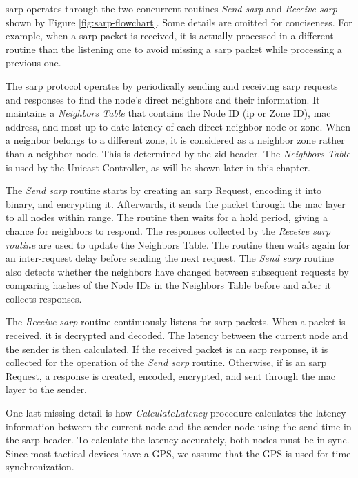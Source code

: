 \acrshort{sarp} operates through the two concurrent routines \textit{Send \acrshort{sarp}} and \textit{Receive \acrshort{sarp}} shown by Figure \ref{fig:sarp-flowchart}.
Some details are omitted for conciseness. For example, when a \acrshort{sarp} packet is received, it is actually processed in a different routine than the listening one to avoid missing a \acrshort{sarp} packet while processing a previous one.

The \acrshort{sarp} protocol operates by periodically sending and receiving \acrshort{sarp} requests and responses to find the node's direct neighbors and their information. It maintains a \textit{Neighbors Table} that contains the Node ID (\acrshort{ip} or Zone ID), \acrshort{mac} address, and most up-to-date latency of each direct neighbor node or zone. When a neighbor belongs to a different zone, it is considered as a neighbor zone rather than a neighbor node. This is determined by the \acrshort{zid} header. The \textit{Neighbors Table} is used by the Unicast Controller, as will be shown later in this chapter.

The \textit{Send \acrshort{sarp}} routine starts by creating an \acrshort{sarp} Request, encoding it into binary, and encrypting it. Afterwards, it sends the packet through the \acrshort{mac} layer to all nodes within range. The routine then waits for a hold period, giving a chance for neighbors to respond. The responses collected by the \textit{Receive \acrshort{sarp} routine} are used to update the Neighbors Table. The routine then waits again for an inter-request delay before sending the next request. The \textit{Send \acrshort{sarp}} routine also detects whether the neighbors have changed between subsequent requests by comparing hashes of the Node IDs in the Neighbors Table before and after it collects responses.

The \textit{Receive \acrshort{sarp}} routine continuously listens for \acrshort{sarp} packets. When a packet is received, it is decrypted and decoded. The latency between the current node and the sender is then calculated. If the received packet is an \acrshort{sarp} response, it is collected for the operation of the \textit{Send \acrshort{sarp}} routine. Otherwise, if is an \acrshort{sarp} Request, a response is created, encoded, encrypted, and sent through the \acrshort{mac} layer to the sender.

One last missing detail is how \textit{CalculateLatency} procedure calculates the latency information between the current node and the sender node using the send time in the \acrshort{sarp} header. To calculate the latency accurately, both nodes must be in sync. Since most tactical devices have a GPS, we assume that the GPS is used for time synchronization. 



